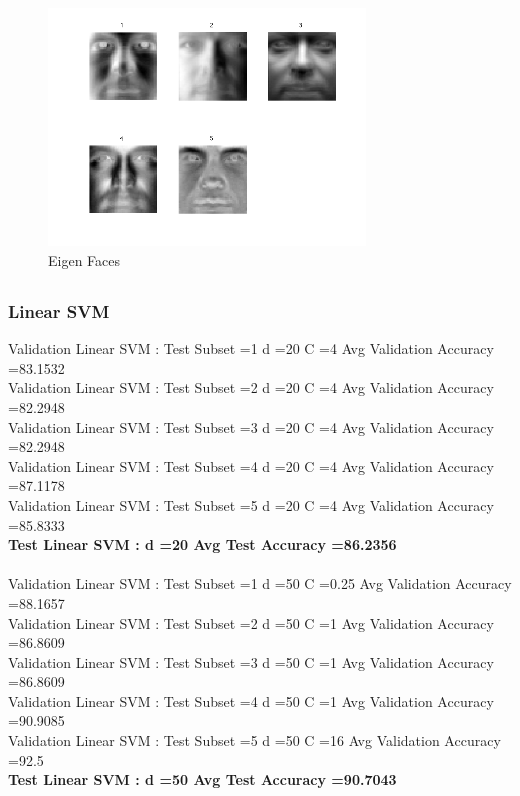 \documentclass[paper=a4, fontsize=11pt]{scrartcl} %
\numberwithin{equation}{section} %
\numberwithin{figure}{section} %
\numberwithin{table}{section} %
\begin{document}
\subsection{}
\begin{figure}[h!]
  \centering
    \includegraphics[width=0.75\textwidth]{../figures/eigenFaces.png}
  \caption{Eigen Faces}
\end{figure}


\subsection{}
\subsubsection{Linear SVM}
Validation Linear SVM : Test Subset =1 d =20 C =4 Avg Validation Accuracy =83.1532\\
Validation Linear SVM : Test Subset =2 d =20 C =4 Avg Validation Accuracy =82.2948\\
Validation Linear SVM : Test Subset =3 d =20 C =4 Avg Validation Accuracy =82.2948\\
Validation Linear SVM : Test Subset =4 d =20 C =4 Avg Validation Accuracy =87.1178\\
Validation Linear SVM : Test Subset =5 d =20 C =4 Avg Validation Accuracy =85.8333\\
\textbf{Test Linear SVM : d =20 Avg Test Accuracy =86.2356}\\\\

Validation Linear SVM : Test Subset =1 d =50 C =0.25 Avg Validation Accuracy =88.1657\\
Validation Linear SVM : Test Subset =2 d =50 C =1 Avg Validation Accuracy =86.8609\\
Validation Linear SVM : Test Subset =3 d =50 C =1 Avg Validation Accuracy =86.8609\\
Validation Linear SVM : Test Subset =4 d =50 C =1 Avg Validation Accuracy =90.9085\\
Validation Linear SVM : Test Subset =5 d =50 C =16 Avg Validation Accuracy =92.5\\
\textbf{Test Linear SVM : d =50 Avg Test Accuracy =90.7043}\\\\
\end{document}
